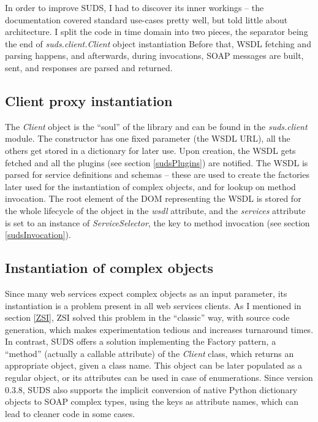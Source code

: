 In order to improve SUDS, I had to discover its inner workings -- the documentation covered standard use-cases pretty well, but told little about architecture. I split the code in time domain into two pieces, the separator being the end of \emph{suds.client.Client} object instantiation Before that, WSDL fetching and parsing happens, and afterwards, during invocations, SOAP messages are built, sent, and responses are parsed and returned.

\subsection{Client proxy instantiation}

The \emph{Client} object is the ``soul'' of the library and can be found in the \emph{suds.client} module. The constructor has one fixed parameter (the WSDL URL), all the others get stored in a dictionary for later use. Upon creation, the WSDL gets fetched and all the plugins (see section \ref{sudsPlugins}) are notified. The WSDL is parsed for service definitions and schemas -- these are used to create the factories later used for the instantiation of complex objects, and for lookup on method invocation. The root element of the DOM representing the WSDL is stored for the whole lifecycle of the object in the \emph{wsdl} attribute, and the \emph{services} attribute is set to an instance of \emph{ServiceSelector}, the key to method invocation (see section \ref{sudsInvocation}).

\subsection{Instantiation of complex objects}

Since many web services expect complex objects as an input parameter, its instantiation is a problem present in all web services clients. As I mentioned in section \ref{ZSI}, ZSI solved this problem in the ``classic'' way, with source code generation, which makes experimentation tedious and increases turnaround times. In contrast, SUDS offers a solution implementing the Factory pattern, a ``method'' (actually a callable attribute) of the \emph{Client} class, which returns an appropriate object, given a class name. This object can be later populated as a regular object, or its attributes can be used in case of enumerations. Since version 0.3.8, SUDS also supports the implicit conversion of native Python dictionary objects to SOAP complex types, using the keys as attribute names, which can lead to cleaner code in some cases.

